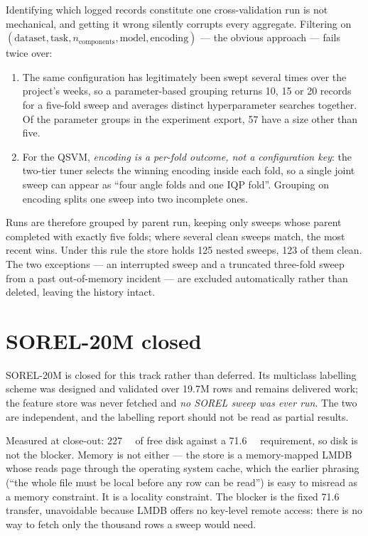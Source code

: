 \documentclass[11pt]{article}
\newcommand{\nc}{\ensuremath{n_{\mathrm{components}}}}
\begin{document}
Identifying which logged records constitute one cross-validation run is not
mechanical, and getting it wrong silently corrupts every aggregate. Filtering on
$(\text{dataset}, \text{task}, \nc{}, \text{model}, \text{encoding})$ --- the
obvious approach --- fails twice over:

\begin{enumerate}
\item The same configuration has legitimately been swept several times over the
project's weeks, so a parameter-based grouping returns 10, 15 or 20 records for
a five-fold sweep and averages distinct hyperparameter searches together. Of the
parameter groups in the experiment export, 57 have a size other than five.
\item For the QSVM, \emph{encoding is a per-fold outcome, not a configuration
key}: the two-tier tuner selects the winning encoding inside each fold, so a
single joint sweep can appear as ``four angle folds and one IQP fold''. Grouping
on encoding splits one sweep into two incomplete ones.
\end{enumerate}

Runs are therefore grouped by parent run, keeping only sweeps whose parent
completed with exactly five folds; where several clean sweeps match, the most
recent wins. Under this rule the store holds 125 nested sweeps, 123 of them
clean. The two exceptions --- an interrupted sweep and a truncated three-fold
sweep from a past out-of-memory incident --- are excluded automatically rather
than deleted, leaving the history intact.

\section{SOREL-20M closed}
\label{sec:sorel}

SOREL-20M is closed for this track rather than deferred. Its multiclass
labelling scheme was designed and validated over 19.7M rows and remains
delivered work; the feature store was never fetched and \emph{no SOREL sweep was
ever run}. The two are independent, and the labelling report should not be read
as partial results.

Measured at close-out: \SI{227}{\gibi\byte} of free disk against a
\SI{71.6}{\gibi\byte} requirement, so disk is not the blocker. Memory is not
either --- the store is a memory-mapped LMDB whose reads page through the
operating system cache, which the earlier phrasing (``the whole file must be
local before any row can be read'') is easy to misread as a memory constraint.
It is a locality constraint. The blocker is the fixed \SI{71.6}{\gibi\byte}
transfer, unavoidable because LMDB offers no key-level remote access: there is
no way to fetch only the thousand rows a sweep would need.
\end{document}
